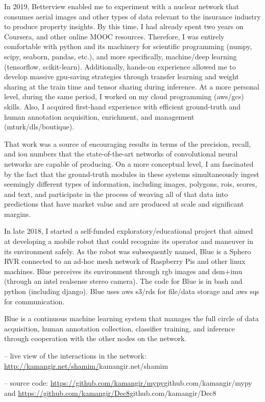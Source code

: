 \osspacing
In 2019, Betterview enabled me to experiment with a nuclear network that consumes aerial images and other types of data relevant to the insurance industry to produce property insights. By this time, I had already spent two years on Coursera, and other online MOOC resources. Therefore, I was entirely comfortable with python and its machinery for scientific programming (numpy, scipy, seaborn, pandas, etc.), and more specifically, machine/deep learning (tensorflow, scikit-learn). Additionally, hands-on experience allowed me to develop massive gpu-saving strategies through transfer learning and weight sharing at the train time and tensor sharing during inference. At a more personal level, during the same period, I worked on my cloud programming (aws/gcs) skills. Also, I acquired first-hand experience with efficient ground-truth and human annotation acquisition, enrichment, and management (mturk/dls/boutique).

\osspacing
That work was a source of encouraging results in terms of the precision, recall, and iou numbers that the state-of-the-art networks of convolutional neural networks are capable of producing. On a more conceptual level, I am fascinated by the fact that the ground-truth modules in these systems simultaneously ingest seemingly different types of information, including images, polygons, rois, scores, and text, and participate in the process of weaving all of that data into predictions that have market value and are produced at scale and significant margins.		


\osspacing
In late 2018, I started a self-funded exploratory/educational project that aimed at developing a mobile robot that could recognize its operator and maneuver in its environment safely. As the robot was subsequently named, Blue is a Sphero RVR connected to an ad-hoc mesh network of Raspberry Pis and other linux machines. Blue perceives its environment through rgb images and dsm+imu (through an intel realsense stereo camera). The code for Blue is in bash and python (including django). Blue uses aws s3/rds for file/data storage and aws sqs for communication.

\osspacing
Blue is a continuous machine learning system that manages the full circle of data acquisition, human annotation collection, classifier training, and inference through cooperation with the other nodes on the network. 

-- live view of the interactions in the network: \url{http://kamangir.net/shamim/}{kamangir.net/shamim} 

-- source code: \url{https://github.com/kamangir/mypy}{github.com/kamangir/mypy} and \url{https://github.com/kamangir/Dec8}{github.com/kamangir/Dec8}


